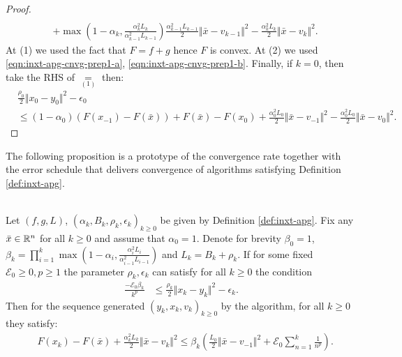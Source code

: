 \documentclass[12pt]{article}
\begin{document}
\begin{proof}
\begin{align*}
            \\ &
            + \max\left(
                    1 - \alpha_k, \frac{\alpha_k^2L_k}{\alpha_{k - 1}^2L_{k - 1}}
                \right)\frac{\alpha_{k - 1}^2L_{k - 1}}{2}\Vert \bar x - v_{k - 1}\Vert^2 
            - \frac{\alpha_k^2L_k}{2}\Vert \bar x - v_k\Vert^2. 
        \end{align*}
        At (1) we used the fact that $F = f + g$ hence $F$ is convex. 
        At (2) we used \eqref{eqn:inxt-apg-cnvg-prep1-a}, \eqref{eqn:inxt-apg-cnvg-prep1-b}. 
        Finally, if $k = 0$, then take the RHS of $\underset{(1)}{=}$ then:
        \begin{align*}
            & \frac{\rho_0}{2}\Vert x_0 - y_0\Vert^2 - \epsilon_0 
            \\
            &\le 
            (1 - \alpha_0)(F(x_{-1}) - F(\bar x)) + F(\bar x) - F(x_0) 
            + \frac{\alpha_0^2L_0}{2}\Vert \bar x - v_{-1}\Vert^2
            - \frac{\alpha_0^2L_0}{2}\Vert \bar x - v_0\Vert^2. 
        \end{align*}
    \end{proof}
    \par
    The following proposition is a prototype of the convergence rate together with the error schedule that delivers convergence of algorithms satisfying Definition \ref{def:inxt-apg}. 
    \begin{proposition}\;\label{prop:inxt-apg-cnvg-generic}\\
        Let $(f, g, L)$, $(\alpha_k, B_k, \rho_k, \epsilon_k)_{k \ge 0}$ be given by Definition \ref{def:inxt-apg}. 
        Fix any $\bar x \in \mathbb R^n$ for all $k \ge 0$ and assume that $\alpha_0 = 1$. 
        Denote for brevity $\beta_0 = 1$, $\beta_k = \prod_{i = 1}^{k} \max\left(1 - \alpha_i, \frac{\alpha_i^2L_i}{\alpha_{i - 1}^2L_{i - 1}}\right)$ and $L_k = B_k + \rho_k$. 
        If for some fixed $\mathcal E_0 \ge 0, p \ge 1$ the parameter $\rho_k, \epsilon_k$ can satisfy for all $k \ge 0$ the condition
        \begin{align*}
            \frac{- \mathcal E_0\beta_k}{k^p} &\le 
            \frac{\rho_k}{2}\Vert x_k - y_k\Vert^2 - \epsilon_k. 
        \end{align*}
        Then for the sequence generated $(y_k, x_k, v_k)_{k \ge 0}$ by the algorithm, for all $k \ge 0$ they satisfy: 
        \begin{align*}
            & F(x_k) - F(\bar x) + \frac{\alpha_k^2L_k}{2}\Vert \bar x - v_k\Vert^2
            \le 
            \beta_k \left(
                \frac{L_0}{2}\Vert \bar x - v_{-1}\Vert^2
                + \mathcal E_0 \sum_{n = 1}^{k} \frac{1}{n^p}
            \right). 
        \end{align*}
    \end{proposition}
\end{document}
